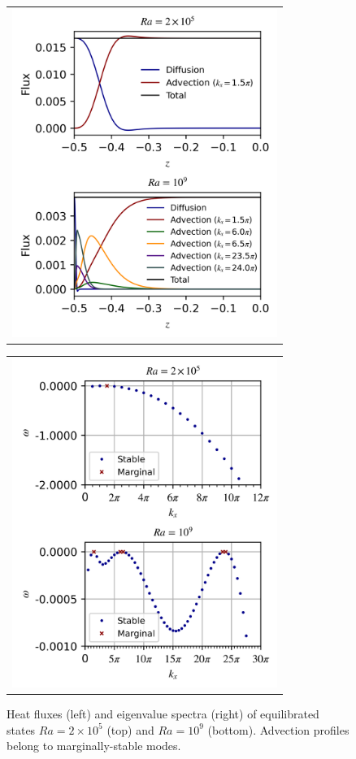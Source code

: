 \documentclass[reprint,amsmath,amssymb,aps]{revtex4-1}
\begin{document}
\begin{figure}
    \centering
    \begin{tabular}{@{}c@{}}
        \includegraphics[width=3.4in]{flux_sup_n.png}
    \end{tabular}
    \begin{tabular}{@{}c@{}}
        \includegraphics[width=3.4in]{EV_spectra_2ra.png}
    \end{tabular}
    \caption{Heat fluxes (left) and eigenvalue spectra (right) of equilibrated states $Ra = 2 \times 10^5$ (top) and $Ra = 10^9$ (bottom). 
    Advection profiles belong to marginally-stable modes. 
}
\end{figure}
\end{document}
